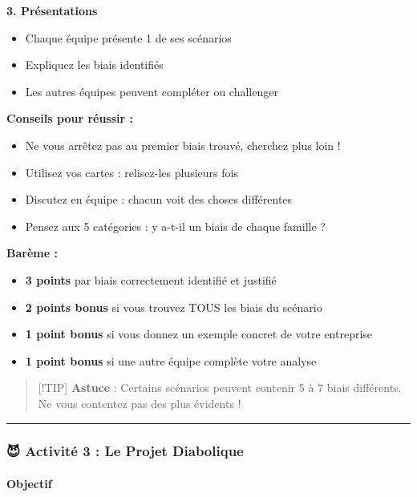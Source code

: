 \documentclass[
]{article}
\providecommand{\tightlist}{%
  \setlength{\itemsep}{0pt}\setlength{\parskip}{0pt}}
\begin{document}
\textbf{3. Présentations}

\begin{itemize}
\tightlist
\item
  Chaque équipe présente 1 de ses scénarios
\item
  Expliquez les biais identifiés
\item
  Les autres équipes peuvent compléter ou challenger
\end{itemize}

\textbf{Conseils pour réussir :}

\begin{itemize}
\tightlist
\item
  Ne vous arrêtez pas au premier biais trouvé, cherchez plus loin !
\item
  Utilisez vos cartes : relisez-les plusieurs fois
\item
  Discutez en équipe : chacun voit des choses différentes
\item
  Pensez aux 5 catégories : y a-t-il un biais de chaque famille ?
\end{itemize}

\textbf{Barème :}

\begin{itemize}
\tightlist
\item
  \textbf{3 points} par biais correctement identifié et justifié
\item
  \textbf{2 points bonus} si vous trouvez TOUS les biais du scénario
\item
  \textbf{1 point bonus} si vous donnez un exemple concret de votre
  entreprise
\item
  \textbf{1 point bonus} si une autre équipe complète votre analyse
\end{itemize}

\begin{quote}
{[}!TIP{]} \textbf{Astuce} : Certains scénarios peuvent contenir 5 à 7
biais différents. Ne vous contentez pas des plus évidents !
\end{quote}

\begin{center}\rule{0.5\linewidth}{0.5pt}\end{center}

\subsubsection{😈 Activité 3 : Le Projet
Diabolique}\label{activituxe9-3-le-projet-diabolique}

\paragraph{\texorpdfstring{\textbf{Objectif}}{Objectif}}\label{objectif-1}
\end{document}
